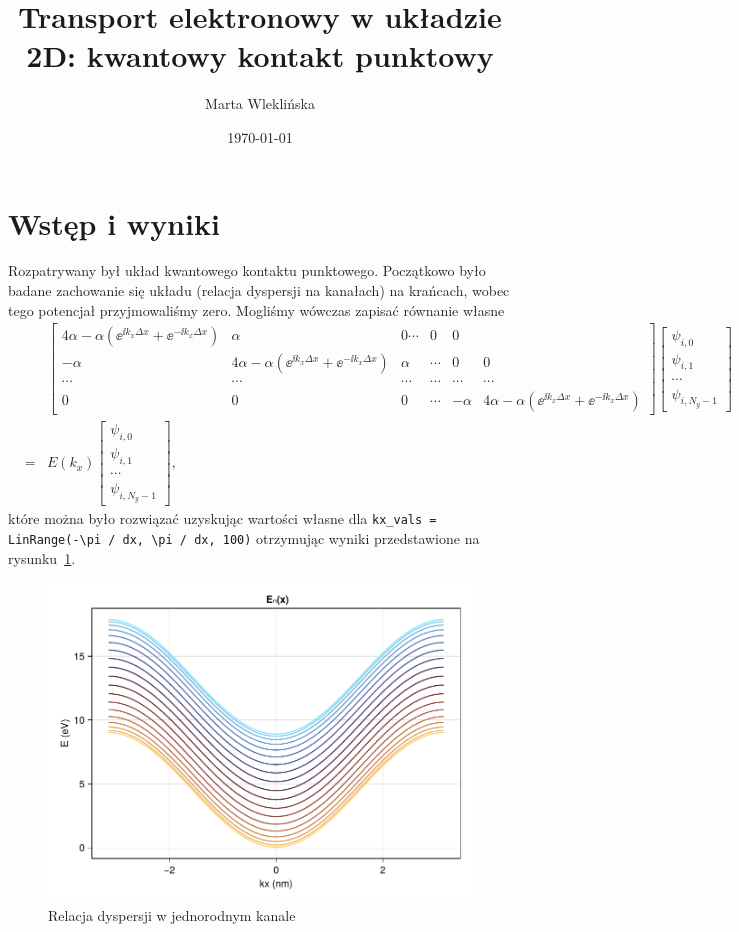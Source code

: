 \documentclass{article}
\title{Transport elektronowy w układzie 2D: kwantowy kontakt punktowy}
\author{Marta Wleklińska}
\date{\today}
\begin{document}
\maketitle

\section{Wstęp i wyniki}
Rozpatrywany był układ kwantowego kontaktu punktowego.
Początkowo było badane zachowanie się układu (relacja dyspersji na kanałach) na krańcach, wobec tego potencjał przyjmowaliśmy zero.
Mogliśmy wówczas zapisać równanie własne
\begin{eqnarray}
&&
    \begin{bmatrix}
        4\alpha - \alpha(\ee ^{\ii k_x \Delta x} + \ee ^{-\ii k_x \Delta x}) & \alpha & 0 \cdots & 0 & 0\\
        -\alpha & 4\alpha - \alpha(\ee ^{\ii k_x \Delta x} + \ee ^{-\ii k_x \Delta x}) & \alpha & \cdots & 0 & 0\\
        \cdots & \cdots & \cdots & \cdots & \cdots & \cdots \\
        0 & 0 & 0 & \cdots & -\alpha & 4\alpha - \alpha(\ee ^{\ii k_x \Delta x} + \ee ^{-\ii k_x \Delta x}) 
    \end{bmatrix}
    \begin{bmatrix}
        \psi_{i,0}\\
        \psi_{i,1}\\
        \cdots \\
        \psi_{i,N_y-1}
    \end{bmatrix}
    \nonumber\\
    &=&
    E(k_x)
    \begin{bmatrix}
        \psi_{i,0}\\
        \psi_{i,1}\\
        \cdots \\
        \psi_{i,N_y-1}
    \end{bmatrix},
\end{eqnarray}
 które można było rozwiązać uzyskując wartości własne dla \texttt{kx\_vals = LinRange(-\textbackslash pi / dx, \textbackslash pi / dx, 100)} otrzymując wyniki przedstawione na rysunku~\ref{fig:ex1_dispersion_relation}.
\begin{figure}[htp!]
    \centering
    \includegraphics[width=0.7\linewidth]{ex1_disperssion_relation.pdf}
    \caption{Relacja dyspersji w jednorodnym kanale }
    \label{fig:ex1_dispersion_relation}
\end{figure}
\end{document}
